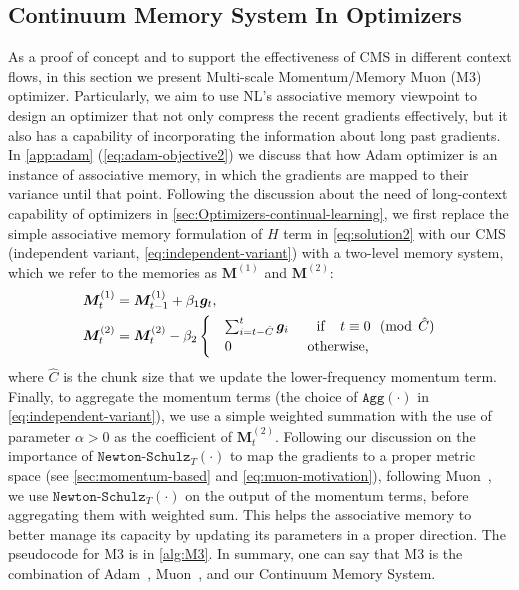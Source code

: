 {\subsection{Continuum Memory System In Optimizers}
As a proof of concept and to support the effectiveness of CMS in different context flows, in this section we present Multi-scale Momentum/Memory Muon (M3) optimizer. Particularly, we aim to use NL's associative memory viewpoint to design an optimizer that not only compress the recent gradients effectively, but it also has a capability of incorporating the information about long past gradients. In \autoref{app:adam} (\autoref{eq:adam-objective2}) we discuss that how Adam optimizer is an instance of associative memory, in which the gradients are mapped to their variance until that point. Following the discussion about the need of long-context capability of optimizers in \autoref{sec:Optimizers-continual-learning}, we first replace the simple associative memory formulation of ${H}$ term in \autoref{eq:solution2} with our CMS (independent variant, \autoref{eq:independent-variant}) with a two-level memory system, which we refer to the memories as $\boldsymbol{M}^{(1)}$ and $\boldsymbol{M}^{(2)}$:
\begin{align}\nonumber
    &\boldsymbol{M}^{(1)}_{t} = \boldsymbol{M}^{(1)}_{t-1} + \beta_1 \boldsymbol{g}_t,   \\ 
    &\boldsymbol{M}^{(2)}_{t} = \boldsymbol{M}^{(2)}_{t} - \beta_2 \begin{cases}
        &\sum_{i = t-\hat{C}}^{t}  \boldsymbol{g}_i  \quad \quad \text{if} \:\:\:\:\:t \equiv 0 \:\:\: (\text{mod} \:\: \hat{C})\\
        &0 \qquad \quad \:\:\qquad \text{otherwise,}
    \end{cases}
\end{align}
where $\hat{C}$ is the chunk size that we update the lower-frequency momentum term. Finally, to aggregate the momentum terms (the choice of $\texttt{Agg}(\cdot)$ in \autoref{eq:independent-variant}), we use a simple weighted summation with the use of parameter $\alpha > 0$ as the coefficient of $\boldsymbol{M}^{(2)}_{t}$. Following our discussion on the importance of $\texttt{Newton-Schulz}_T(\cdot)$ to map the gradients to a proper metric space (see \autoref{sec:momentum-based} and \autoref{eq:muon-motivation}), following Muon~\citep{jordanmuon}, we use $\texttt{Newton-Schulz}_T(\cdot)$ on the output of the momentum terms, before aggregating them with weighted sum. This helps the associative memory to better manage its capacity by updating its parameters in a proper direction. The pseudocode for M3 is in \autoref{alg:M3}. In summary, one can say that M3 is the combination of Adam~\citep{kingma2014adam}, Muon~\citep{jordanmuon}, and our Continuum Memory System.


}
